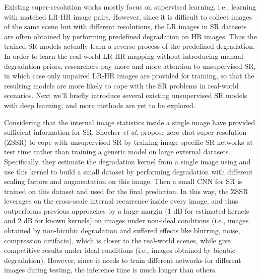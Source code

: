 {\label{sec_unsupervised_sr}
Existing super-resolution works mostly focus on supervised learning, i.e., learning with matched LR-HR image pairs.
However, since it is difficult to collect images of the same scene but with different resolutions, the LR images in SR datasets are often obtained by performing predefined degradation on HR images.
Thus the trained SR models actually learn a reverse process of the predefined degradation.
In order to learn the real-world LR-HR mapping without introducing manual degradation priors, researchers pay more and more attention to unsupervised SR, in which case only unpaired LR-HR images are provided for training, so that the resulting models are more likely to cope with the SR problems in real-world scenarios.
Next we'll briefly introduce several existing unsupervised SR models with deep learning, and more methods are yet to be explored.

Considering that the internal image statistics inside a single image have provided sufficient information for SR, Shocher \textit{et al.}  propose zero-shot super-resolution (ZSSR) to cope with unsupervised SR by training image-specific SR networks at test time rather than training a generic model on large external datasets.
Specifically, they estimate the degradation kernel from a single image using  and use this kernel to build a small dataset by performing degradation with different scaling factors and augmentation on this image.
Then a small CNN for SR is trained on this dataset and used for the final prediction.
In this way, the ZSSR leverages on the cross-scale internal recurrence inside every image, and thus outperforms previous approaches by a large margin ($1$ dB for estimated kernels and $2$ dB for known kernels) on images under non-ideal conditions (i.e., images obtained by non-bicubic degradation and suffered effects like blurring, noise, compression artifacts), which is closer to the real-world scenes, while give competitive results under ideal conditions (i.e., images obtained by bicubic degradation).
However, since it needs to train different networks for different images during testing, the inference time is much longer than others.

}
